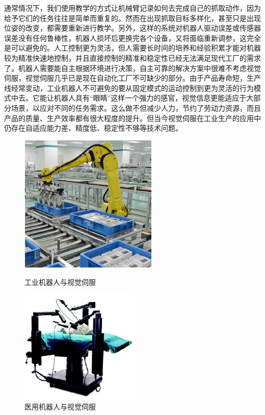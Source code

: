 \documentclass[fontset=fandol,type=bachelor,campus=harbin,bsmainpagenumberline=true]{hithesisbook}
\begin{document}
通常情况下，我们使用教学的方式让机械臂记录如何去完成自己的抓取动作，因为给予它们的任务往往是简单而重复的。然而在出现抓取目标多样化，甚至只是出现位姿的改变，都需要重新进行教学\cite{tsuchida2021characteristics}。另外，这样的系统对机器人驱动误差或传感器误差没有任何鲁棒性，机器人损坏后更换完各个设备，又将面临重新调参，这完全是可以避免的。人工控制更为灵活，但人需要长时间的培养和经验积累才能对机器较为精准快速地控制，并且直接控制的精准和稳定性已经无法满足现代工厂的需求了。机器人需要能自主根据环境进行决策，自主可靠的解决方案中很难不考虑视觉伺服，视觉伺服几乎已是现在自动化工厂不可缺少的部分。由于产品寿命短，生产线经常变动，工业机器人不可避免的要从固定模式的运动控制到更为灵活的行为模式中去。它能让机器人具有“眼睛”这样一个强力的感官，视觉信息更能适应于大部分场景，以应对不同的任务需求。这么做不但减少人力，节约了劳动力资源，而且产品的质量、生产效率都有很大程度的提升\cite{zh1}。但当今视觉伺服在工业生产的应用中仍存在自适应能力差、精度低、稳定性不够等技术问题。
\begin{figure}[htbp]
\centering
\begin{minipage}[t]{0.48\textwidth}
\centering
\includegraphics[scale=1.0]{chapter1/工业机器人}
\caption{工业机器人与视觉伺服}
\end{minipage}
\begin{minipage}[t]{0.48\textwidth}
\centering
\includegraphics[scale=1.0]{chapter1/医用机器人}
\caption{医用机器人与视觉伺服}
\end{minipage}
\end{figure}
\end{document}
